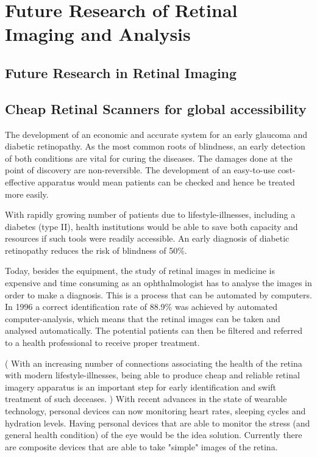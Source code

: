 
\chapter{Future Research of Retinal Imaging and Analysis}

\label{future_research}
\section{Future Research in Retinal Imaging}
\label{future}

\section{Cheap Retinal Scanners for global accessibility}

The development of an economic and accurate system for an early
glaucoma and diabetic retinopathy. As the most common roots of
blindness, an early detection of both conditions are vital for
curing the diseases. The damages done at the point of discovery
are non-reversible. The development of an easy-to-use cost-effective
apparatus would mean patients can be checked and hence be treated
more easily.

With rapidly growing number of patients due to lifestyle-illnesses,
including a diabetes (type II), health institutions would be able
to save both capacity and resources if such tools were readily
accessible. An early diagnosis of diabetic retinopathy reduces
the risk of blindness of 50\%.\cite{}

Today, besides the equipment, the study of retinal images in medicine
is expensive and time consuming as an ophthalmologist has to analyse
the images in order to make a diagnosis. This is a process that can
be automated by computers.  In 1996 a correct identification rate of
88.9\%
was achieved by automated computer-analysis, which means that the
retinal images can be taken and analysed automatically. The potential
patients can then be filtered and referred to a health professional
to receive proper treatment.\cite{}

( With an increasing number of connections associating the health
of the retina with modern lifestyle-illnesses, being able to produce
cheap and reliable retinal imagery apparatus is an important step for
early identification and swift treatment of such deceases. ) With
recent advances in the state of wearable technology, personal devices
can now monitoring heart rates, sleeping cycles and hydration levels.
Having personal devices that are able to monitor the stress (and
general health condition) of the eye would be the idea solution.
Currently there are composite devices that are able to take "simple"
images of the retina\cite{}.
 

